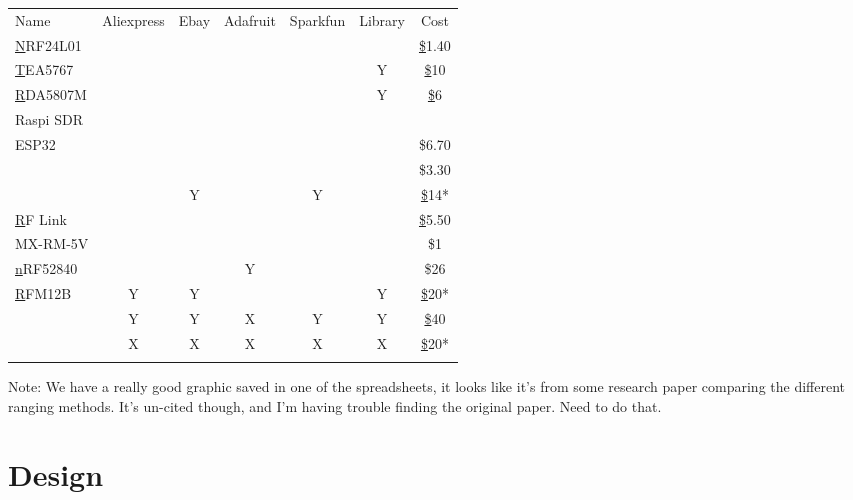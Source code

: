 \documentclass{article}
\begin{document}
\begin{table}[]
\begin{tabular}{lcccccc}
\rowcolor[HTML]{E7E6E6} 
{\color[HTML]{44546A} Name} & {\color[HTML]{44546A} Aliexpress} & {\color[HTML]{44546A} Ebay} & {\color[HTML]{44546A} Adafruit} & {\color[HTML]{44546A} Sparkfun} & {\color[HTML]{44546A} Library} & {\color[HTML]{44546A} Cost} \\
{\color[HTML]{0563C1} {\ul NRF24L01}} &  &  &  &  &  & {\color[HTML]{0563C1} {\ul \$1.40}} \\
{\color[HTML]{0563C1} {\ul TEA5767}} &  &  &  &  & Y & {\color[HTML]{0563C1} {\ul \$10}} \\
{\color[HTML]{0563C1} {\ul RDA5807M}} &  &  &  &  & Y & {\color[HTML]{0563C1} {\ul \$6}} \\
Raspi SDR &  &  &  &  &  &  \\
\cellcolor[HTML]{FFFF00}ESP32 &  &  &  &  &  & \$6.70 \\
\cellcolor[HTML]{FFFF00}{\color[HTML]{0563C1} {\ul ESP8266}} &  &  &  &  &  & \$3.30 \\
\cellcolor[HTML]{FFFF00}{\color[HTML]{0563C1} {\ul RFM69HCW}} &  & Y &  & Y &  & {\color[HTML]{0563C1} {\ul \$14*}} \\
{\color[HTML]{0563C1} {\ul RF Link}} &  &  &  &  &  & {\color[HTML]{0563C1} {\ul \$5.50}} \\
MX-RM-5V &  &  &  &  &  & \$1 \\
{\color[HTML]{0563C1} {\ul nRF52840}} &  &  & Y &  &  & \$26 \\
{\color[HTML]{0563C1} {\ul RFM12B}} & Y & Y &  &  & Y & {\color[HTML]{0563C1} {\ul \$20*}} \\
\cellcolor[HTML]{FFFF00}{\color[HTML]{0563C1} {\ul DWM1000}} & Y & Y & X & Y & Y & {\color[HTML]{0563C1} {\ul \$40}} \\
\cellcolor[HTML]{E2EFDA}{\color[HTML]{0563C1} {\ul DWM3000}} & X & X & X & X & X & {\color[HTML]{0563C1} {\ul \$20*}} \\
 &  &  &  &  &  & 
\end{tabular}
\end{table}


Note: We have a really good graphic saved in one of the spreadsheets, it looks like it's from some research paper comparing the different ranging methods. It's un-cited though, and I'm having trouble finding the original paper. Need to do that.

\section{Design}
\end{document}
